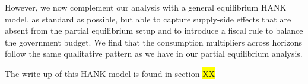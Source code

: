 \begin{itemize}
	However,  we now complement our analysis with a  general equilibrium HANK model, as standard as possible, but able to capture supply-side effects that are absent from the partial equilibrium setup and to introduce a fiscal rule to balance the government budget. We find that the consumption multipliers across horizons follow the same qualitative pattern as we have in our partial equilibrium analysis.
	
	The write up of this HANK model is found in section \colorbox{yellow}{XX}
	
	
\end{itemize}